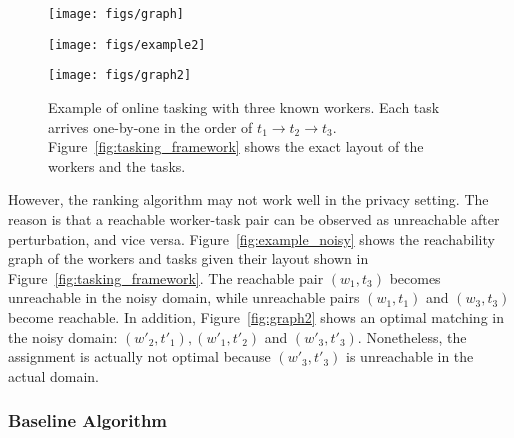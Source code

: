 \documentclass{USC-Thesis}
\numberwithin{equation}{chapter}
\begin{document}
\begin{figure}[ht]
	\begin{minipage}[b]{.30\linewidth}
		\centering 
		\texttt{[image: figs/graph]}
		\label{fig:graph}
	\end{minipage}
	\begin{minipage}[b]{.38\linewidth}
		\centering
		\texttt{[image: figs/example2]}
		\label{fig:example_noisy}
	\end{minipage}
	\begin{minipage}[b]{.30\linewidth}
		\centering 
		\texttt{[image: figs/graph2]}
		\label{fig:graph2}
	\end{minipage}
	\caption{Example of online tasking with three known workers. Each task arrives one-by-one in the order of $t_1\rightarrow t_2\rightarrow t_3$. Figure~\ref{fig:tasking_framework} shows the exact layout of the workers and the tasks.}
	\label{fig:exam}
\end{figure}

However, the ranking algorithm may not work well in the privacy setting. The reason is that a reachable worker-task pair can be observed as unreachable after perturbation, and vice versa. Figure~\ref{fig:example_noisy} shows the reachability graph of the workers and tasks given their layout shown in Figure~\ref{fig:tasking_framework}. The reachable pair $(w_1,t_3)$ becomes unreachable in the noisy domain, while unreachable pairs $(w_1,t_1)$ and $(w_3,t_3)$ become reachable. In addition, Figure~\ref{fig:graph2} shows an optimal matching in the noisy domain: $(w'_2,t'_1), (w'_1,t'_2)$ and $(w'_3,t'_3)$. Nonetheless, the assignment is actually not optimal because $(w'_3,t'_3)$ is unreachable in the actual domain.

\subsubsection{Baseline Algorithm}
\label{sec:baseline}
\end{document}
